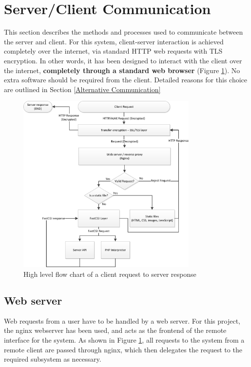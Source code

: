 

\section{Server/Client Communication}\label{Server/Client Communication}


This section describes the methods and processes used to communicate between the server and client. For this system, client-server interaction is achieved completely over the internet, via standard HTTP web requests with TLS encryption. In other words, it has been designed to interact with the client over the internet, {\bf completely through a standard web browser} (Figure \ref{client_request_flowchart.png}). No extra software should be required from the client. Detailed reasons for this choice are outlined in Section \ref{Alternative Communication}

\begin{figure}[H]
	\centering
	\includegraphics[width=0.8\textwidth]{figures/client_request_flowchart.png}
	\caption{High level flow chart of a client request to server response} 
	\label{client_request_flowchart.png}
\end{figure}

\subsection{Web server}

Web requests from a user have to be handled by a web server. For this project, the nginx\cite{nginx} webserver has been used, and acts as the frontend of the remote interface for the system. As shown in Figure \ref{client_request_flowchart.png}, all requests to the system from a remote client are passed through nginx, which then delegates the request to the required subsystem as necessary. 

